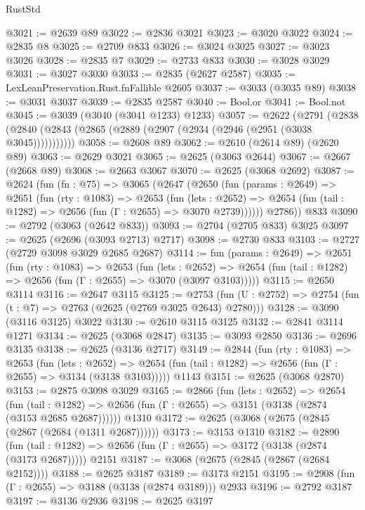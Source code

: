 \begin{lexlean}{RustStd}
\begin{coremodule}
@3021 := @2639 @89
@3022 := @2836 @3021
@3023 := @3020 @3022
@3024 := @2835 @8
@3025 := @2709 @833
@3026 := @3024 @3025
@3027 := @3023 @3026
@3028 := @2835 @7
@3029 := @2733 @833
@3030 := @3028 @3029
@3031 := @3027 @3030
@3033 := @2835 (@2627 @2587)
@3035 := LexLeanPreservation.Rust.fnFallible @2605
@3037 := @3033 (@3035 @89)
@3038 := @3031 @3037
@3039 := @2835 @2587
@3040 := Bool.or
@3041 := Bool.not
@3045 := @3039 (@3040 (@3041 @1233) @1233)
@3057 := @2622
    (@2791 (@2838 (@2840 (@2843 (@2865 (@2889 (@2907 (@2934 (@2946 (@2951 (@3038 @3045)))))))))))
@3058 := @2608 @89
@3062 := @2610 (@2614 @89) (@2620 @89)
@3063 := @2629 @3021
@3065 := @2625 (@3063 @2644)
@3067 := @2667 (@2668 @89)
@3068 := @2663 @3067
@3070 := @2625 (@3068 @2692)
@3087 := @2624
    (fun (fn : @75) =>
    @3065
      (@2647
        (@2650
          (fun (params : @2649) =>
          @2651
            (fun (rty : @1083) =>
            @2653
              (fun (lets : @2652) =>
              @2654 (fun (tail : @1282) => @2656 (fun (Γ : @2655) => @3070 @2739))))))
        @2786))
    @833
@3090 := @2792 (@3063 (@2642 @833))
@3093 := @2704 (@2705 @833) @3025
@3097 := @2625 (@2696 (@3093 @2713) @2717)
@3098 := @2730 @833
@3103 := @2727 (@2729 @3098 @3029 @2685 @2687)
@3114 := fun (params : @2649) =>
  @2651
    (fun (rty : @1083) =>
    @2653
      (fun (lets : @2652) =>
      @2654 (fun (tail : @1282) => @2656 (fun (Γ : @2655) => @3070 (@3097 @3103)))))
@3115 := @2650 @3114
@3116 := @2647 @3115
@3125 := @2753 (fun (U : @2752) => @2754 (fun (t : @7) => @2763 (@2625 (@2769 @3025 @2643) @2780)))
@3128 := @3090 (@3116 @3125) @3022
@3130 := @2610 @3115 @3125
@3132 := @2841 @3114 @1271
@3134 := @2625 (@3068 @2847)
@3135 := @3093 @2850
@3136 := @2696 @3135
@3138 := @2625 (@3136 @2717)
@3149 := @2844
    (fun (rty : @1083) =>
    @2653
      (fun (lets : @2652) =>
      @2654 (fun (tail : @1282) => @2656 (fun (Γ : @2655) => @3134 (@3138 @3103)))))
    @1143
@3151 := @2625 (@3068 @2870)
@3153 := @2875 @3098 @3029
@3165 := @2866
    (fun (lets : @2652) =>
    @2654
      (fun (tail : @1282) => @2656 (fun (Γ : @2655) => @3151 (@3138 (@2874 (@3153 @2685 @2687))))))
    @1310
@3172 := @2625 (@3068 (@2675 (@2845 (@2867 (@2684 (@1311 @2687))))))
@3173 := @3153 @1310
@3182 := @2890
    (fun (tail : @1282) => @2656 (fun (Γ : @2655) => @3172 (@3138 (@2874 (@3173 @2687)))))
    @2151
@3187 := @3068 (@2675 (@2845 (@2867 (@2684 @2152))))
@3188 := @2625 @3187
@3189 := @3173 @2151
@3195 := @2908 (fun (Γ : @2655) => @3188 (@3138 (@2874 @3189))) @2933
@3196 := @2792 @3187
@3197 := @3136 @2936
@3198 := @2625 @3197

\end{coremodule}
\end{lexlean}
